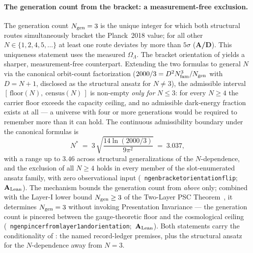 \documentclass[11pt]{article}
\theoremstyle{remark}
\newcommand{\lean}[1]{%
  \penalty-100
  \begingroup\def\_{\textunderscore\allowbreak}\texttt{#1}\endgroup}
\newcommand{\OmL}{\Omega_\Lambda}
\newcommand{\CatAL}{\ensuremath{\textbf{A}_{\rm Lean}}}
\newcommand{\CatAD}{\textbf{A/D}}
\begin{document}
\paragraph{The generation count from the bracket: a measurement-free exclusion.}
The generation count $N_{\rm gen} = 3$ is the unique integer for which both
structural routes simultaneously bracket the Planck~2018 value; for all other
$N \in \{1,2,4,5,\ldots\}$ at least one route deviates by more than $5\sigma$
(\CatAD). This uniqueness statement uses the measured $\OmL$. The bracket
orientation of  yields a sharper, measurement-free
counterpart. Extending the two formulas to general $N$ via the canonical
orbit-count factorization ($2000/3 = D^2 N_{\rm fam}^3/N_{\rm gen}$ with
$D = N+1$, disclosed as the structural ansatz for $N \neq 3$), the admissible
interval $[\,\text{floor}(N),\ \text{census}(N)\,]$ is non-empty \emph{only for}
$N \le 3$: for every $N \ge 4$ the carrier floor exceeds the capacity ceiling,
and no admissible dark-energy fraction exists at all --- a universe with four
or more generations would be required to remember more than it can hold. The
continuous admissibility boundary under the canonical formulas is
\begin{equation}
  N^* \;=\; 3\,\sqrt{\frac{14\ln(2000/3)}{9\pi^2}} \;=\; 3.037,
  \label{eq:nstar}
\end{equation}
with a range up to $3.46$ across structural generalizations of the
$N$-dependence, and the exclusion of all $N \ge 4$ holds in every member of the
slot-enumerated ansatz family, with zero observational input
\mbox{(\lean{ngen\_bracket\_orientation\_flip}; \CatAL)}.
The mechanism bounds the generation count from \emph{above} only; combined with
the Layer-I lower bound $N_{\rm gen} \ge 3$ of the Two-Layer PSC
Theorem~\cite{SpivackNEMS05}, it determines $N_{\rm gen} = 3$ without
invoking Presentation Invariance --- the generation count is pincered between
the gauge-theoretic floor and the cosmological ceiling
\mbox{(\lean{ngen\_pincer\_from\_layer1\_and\_orientation}; \CatAL)}.
Both statements carry the conditionality of : the named
record-ledger premises, plus the structural ansatz for the $N$-dependence away
from $N = 3$.
\end{document}
